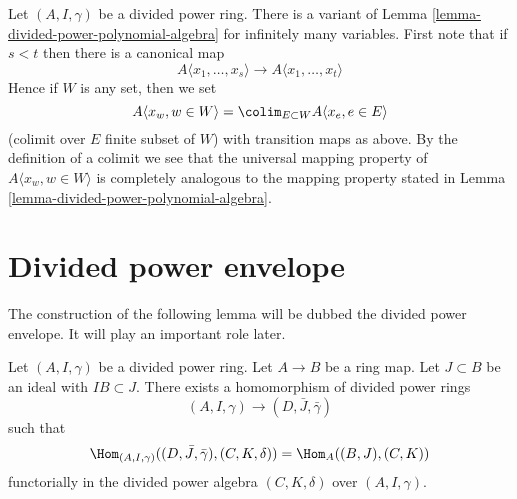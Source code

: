 \begin{remark}
\label{remark-divided-power-polynomial-algebra}
Let $(A, I, \gamma)$ be a divided power ring.
There is a variant of Lemma \ref{lemma-divided-power-polynomial-algebra}
for infinitely many variables. First note that if $s < t$ then there
is a canonical map
$$
A\langle x_1, \ldots, x_s \rangle \to A\langle x_1, \ldots, x_t\rangle
$$
Hence if $W$ is any set, then we set
$$
A\langle x_w, w \in W\rangle =
\colim_{E \subset W} A\langle x_e, e \in E\rangle
$$
(colimit over $E$ finite subset of $W$)
with transition maps as above. By the definition of a colimit we see
that the universal mapping property of $A\langle x_w, w \in W\rangle$ is
completely analogous to the mapping property stated in
Lemma \ref{lemma-divided-power-polynomial-algebra}.
\end{remark}




\section{Divided power envelope}
\label{section-divided-power-envelope}

\noindent
The construction of the following lemma will be dubbed the
divided power envelope. It will play an important role later.

\begin{lemma}
\label{lemma-divided-power-envelope}
Let $(A, I, \gamma)$ be a divided power ring.
Let $A \to B$ be a ring map. Let $J \subset B$ be an ideal
with $IB \subset J$. There exists a homomorphism of
divided power rings
$$
(A, I, \gamma) \longrightarrow (D, \bar J, \bar \gamma)
$$
such that
$$
\Hom_{(A, I, \gamma)}((D, \bar J, \bar \gamma), (C, K, \delta))
=
\Hom_A((B, J), (C, K))
$$
functorially in the divided power algebra $(C, K, \delta)$ over
$(A, I, \gamma)$.
\end{lemma}

